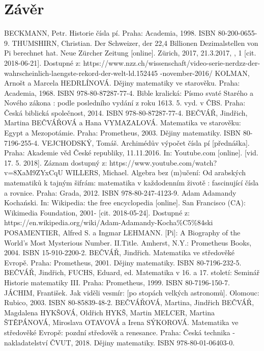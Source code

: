 \documentclass[rocnikovka]{gzwroc} %
\begin{document}
\section{Závěr}
\newpage
\begin{oldthebibliography}{99}
BECKMANN, Petr. Historie čísla pí. Praha: Academia, 1998. ISBN 80-200-0655-9.
THUMSHIRN, Christian. Der Schweizer, der 22,4 Billionen Dezimalstellen von Pi berechnet hat. Neue Zürcher Zeitung [online]. Zürich, 2017, 21.3.2017, , 1 [cit. 2018-06-21]. Dostupné z: https://www.nzz.ch/wissenschaft/video-serie-nerdzz-der-wahrscheinlich-laengste-rekord-der-welt-ld.152445
-november-2016/
KOLMAN, Arnošt a Marcela HEDRLÍNOVÁ. Dějiny matematiky ve starověku. Praha: Academia, 1968. ISBN 978-80-87287-77-4.
Bible kralická: Písmo svaté Starého a Nového zákona : podle posledního vydání z roku 1613. 5. vyd. v ČBS. Praha: Česká biblická společnost, 2014. ISBN 978-80-87287-77-4.
BEČVÁŘ, Jindřich, Martina BEČVÁŘOVÁ a Hana VYMAZALOVÁ. Matematika ve starověku: Egypt a Mezopotámie. Praha: Prometheus, 2003. Dějiny matematiky. ISBN 80-7196-255-4.
VEJCHODSKÝ, Tomáš. Archimédův výpočet čísla pí [přednáška]. Praha: Akademie věd České republiky, 11.11.2016. In: Youtube.com [online]. [vid. 17. 5. 2018]. Záznam dostupný z: https://www.youtube.com/watch?v=8XaM9ZYxCqU
WILLERS, Michael. Algebra bez (m)učení: Od arabských matematiků k tajným šifrám: matematika v každodenním životě : fascinující čísla a rovnice. Praha: Grada, 2012. ISBN 978-80-247-4123-9.
Adam Adamandy Kochański. In: Wikipedia: the free encyclopedia [online]. San Francisco (CA): Wikimedia Foundation, 2001- [cit. 2018-05-24]. Dostupné z: https://en.wikipedia.org/wiki/Adam-Adamandy-Kocha\%C5\%84ski
POSAMENTIER, Alfred S. a Ingmar LEHMANN. [Pi]: A Biography of the World's Most Mysterious Number. II.Title. Amherst, N.Y.: Prometheus Books, 2004. ISBN 15-910-2200-2.
BEČVÁŘ, Jindřich. Matematika ve středověké Evropě. Praha: Prometheus, 2001. Dějiny matematiky. ISBN 80-7196-232-5.
BEČVÁŘ, Jindřich, FUCHS, Eduard, ed. Matematika v 16. a 17. století: Seminář Historie matematiky III. Praha: Prometheus, 1999. ISBN 80-7196-150-7.
JÁCHIM, František. Jak viděli vesmír: [po stopách velkých astronomů]. Olomouc: Rubico, 2003. ISBN 80-85839-48-2.
BEČVÁŘOVÁ, Martina, Jindřich BEČVÁŘ, Magdalena HYKŠOVÁ, Oldřich HYKŠ, Martin MELCER, Martina ŠTĚPÁNOVÁ, Miroslava OTAVOVÁ a Irena SÝKOROVÁ. Matematika ve středověké Evropě: pozdní středověk a renesance. Praha: Česká technika - nakladatelství ČVUT, 2018. Dějiny matematiky. ISBN 978-80-01-06403-0.

\end{oldthebibliography}
\end{document}
